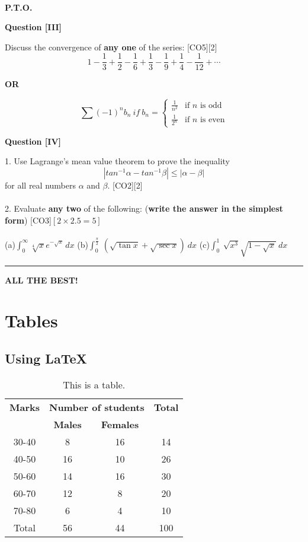 \documentclass[12pt]{article}
\begin{document}
\\\begin{flushright}
\textbf{P.T.O.}
\end{flushright}
\newpage
\begin{flushleft}
\large\textbf{Question [III]}
\end{flushleft}
Discuss the convergence of \textbf{any one} of the series: \hfill [CO5][2]
$$1-\frac{1}{3}+\frac{1}{2}-\frac{1}{6}+\frac{1}{3}-\frac{1}{9}+\frac{1}{4}-\frac{1}{12}+ \cdots$$
\begin{center}
\textbf{OR}
\end{center}
$$\sum_{}^{}(-1)^{n}b_{n}\ if \ b_{n}= \begin{cases}
\frac{1}{n^{2}} & \text{if $n$ is odd}
\\\frac{1}{2^{n}} & \text{if $n$ is even}
\end{cases} $$
\begin{flushleft}
\large\textbf{Question [IV]}
\end{flushleft}
1. Use Lagrange's mean value theorem to prove the inequality $$|tan^{-1}\alpha - tan^{-1}\beta|\le |\alpha-\beta|$$ for all real numbers $\alpha$ and $\beta$. \hfill [CO2][2]
\\\\2. Evaluate \textbf{any two} of the following: (\textbf{write the answer in the simplest form}) \hfill[CO3]$[2\times2.5=5]$
\\\\(a)$\int_{0}^{\infty} \sqrt[4]{x}e^{-\sqrt{x}}\,dx$
(b)$\int_{0}^{\frac{\pi}{2}} \ (\sqrt{\tan x}+ \sqrt{\sec x}) \ dx$
(c)$\int_{0}^{1} \ \sqrt{x^{3}} \sqrt{1-\sqrt{x}}\ dx$
\vspace{2cm}\hrule
\begin{center}
\textbf{ALL THE BEST!}
\end{center}
\newpage
\section{Tables}
\subsection{Using \LaTeX\ }
\begin{table}[h!]
\begin{center}
\begin{tabular}{|c|c|c|c|}
\hline
\textbf{\large Marks} & \multicolumn{2}{c|}{\textbf{\large Number of students}} & \textbf{\large Total} \\
\cline{2-3}
  & \textbf{Males} & \textbf{Females} & \\
  \hline
  30-40 & 8 & 16 & 14 \\
  \hline
  40-50 & 16 & 10 & 26 \\
  \hline
  50-60 & 14 & 16 & 30 \\
  \hline
  60-70 & 12 & 8 & 20 \\
  \hline
  70-80 & 6 & 4 & 10 \\
  \hline
  Total & 56 & 44 & 100 \\
  \hline
\end{tabular}
\caption{This is a table.}
\label{Table 1.1}
\end{center}
\end{table}
\end{document}

